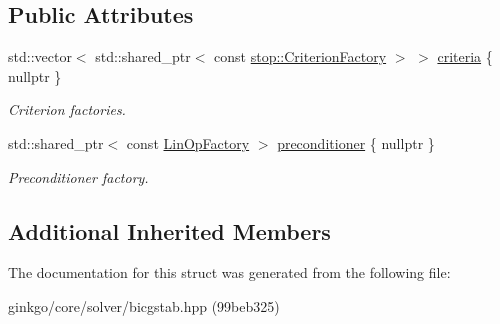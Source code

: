 \subsection*{Public Attributes}
\begin{DoxyCompactItemize}
\item 
\mbox{\label{structgko_1_1solver_1_1Bicgstab_1_1parameters__type_a98e25950c6dcaa68eacc241fbc8bd521}} 
std\+::vector$<$ std\+::shared\+\_\+ptr$<$ const \hyperlink{group__stop_gab12a51109c50b35ec36dc5a393d6a9a0}{stop\+::\+Criterion\+Factory} $>$ $>$ \hyperlink{structgko_1_1solver_1_1Bicgstab_1_1parameters__type_a98e25950c6dcaa68eacc241fbc8bd521}{criteria} \{ nullptr \}
\begin{DoxyCompactList}\small\item\em Criterion factories. \end{DoxyCompactList}\item 
\mbox{\label{structgko_1_1solver_1_1Bicgstab_1_1parameters__type_a758bdb82889e200ff6800e34e9a2d5c4}} 
std\+::shared\+\_\+ptr$<$ const \hyperlink{classgko_1_1LinOpFactory}{Lin\+Op\+Factory} $>$ \hyperlink{structgko_1_1solver_1_1Bicgstab_1_1parameters__type_a758bdb82889e200ff6800e34e9a2d5c4}{preconditioner} \{ nullptr \}
\begin{DoxyCompactList}\small\item\em Preconditioner factory. \end{DoxyCompactList}\end{DoxyCompactItemize}
\subsection*{Additional Inherited Members}


The documentation for this struct was generated from the following file\+:\begin{DoxyCompactItemize}
\item 
ginkgo/core/solver/bicgstab.\+hpp (99beb325)\end{DoxyCompactItemize}
